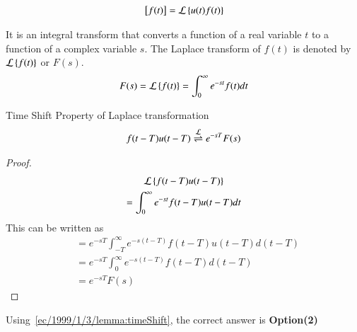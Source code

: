 \begin{definition}
\begin{align}
    {}\left[f (t)\right]=\mathcal{L}\left\{u (t) f (t)\right\}
\end{align}
\end{definition}
\begin{definition}
    It is an integral transform that converts a function of a real variable $t$ to a function of a complex variable $s$. The Laplace transform of $f(t)$ is denoted by $\mathcal{L}\left\{f(t)\right\}$ or $F(s)$.
    \begin{align}
        F(s)=\mathcal{L}\left\{f(t)\right\}=\int_{0}^{\infty}e^{-st}f(t)dt
    \end{align}
\end{definition}
\begin{lemma}\label{ec/1999/1/3/lemma:timeShift}
    Time Shift Property of Laplace transformation
    \begin{align}
        f(t-T)u(t-T) \overset{\mathcal{L}}{ \rightleftharpoons} e^{-sT}F(s)
    \end{align}
\end{lemma}
\begin{proof}
    \begin{multline}
        \mathcal{L}\left\{f(t-T)u(t-T)\right\}\\=\int_{0}^{\infty}e^{-st}f(t-T)u(t-T)dt\\
    \end{multline}
    This can be written as
    \begin{align}
        &=e^{-sT}\int_{-T}^{\infty}e^{-s(t-T)}f(t-T)u(t-T)d(t-T)\\
        &=e^{-sT}\int_{0}^{\infty}e^{-s(t-T)}f(t-T)d(t-T)\\
        &=e^{-sT}F(s)
    \end{align}

\end{proof}

Using~\eqref{ec/1999/1/3/lemma:timeShift}, the correct answer is \textbf{Option(2)}
